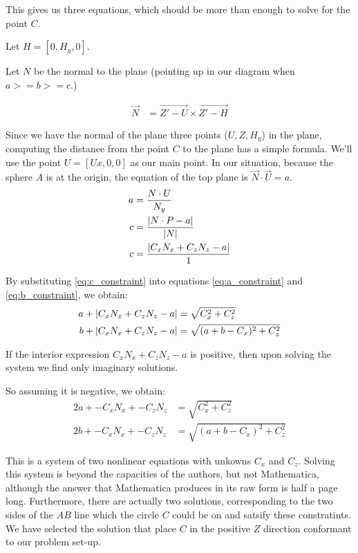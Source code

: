 \documentclass{article}
\begin{document}
This gives us three equations, which
should be more than enough to solve for the point $C$.

Let $H = [0, H_y,0]$.

Let $N$ be the normal to the plane (pointing up in our diagram
when $ a >= b >= c $.)

\begin{align}
\overrightarrow{N} &= \overrightarrow{Z' - U}  \times \overrightarrow{Z' - H}
\end{align}

Since we have the normal of the plane three points ($U,Z,H_y$) in the plane,
computing the distance from the point $C$ to the plane has a simple
formula.
We'll use the point $U = [Ux, 0, 0]$ as our main point.
In our situation, because the sphere $A$ is at the origin,
the equation of the top plane  is
$ \overrightarrow{N} \cdot \overrightarrow{U} = a$.
\begin{align}
a &= \frac{N \cdot U}{N_y} \\
c &= \frac{\left\lvert N \cdot P - a\right\rvert}{\left\lvert N\right\rvert} \\
c &= \frac{\left\lvert C_x  N_x  + C_z  N_z - a\right\rvert}{1} \label{eq:c_constraint}
\end{align}

By substituting \ref{eq:c_constraint} into equations
\ref{eq:a_constraint} and \ref{eq:b_constraint},
we obtain:
\begin{align}
  a + \left\lvert C_x N_x + C_z N_z - a\right\rvert &= \sqrt{C_x^2 + C_z^2} \\
  b + \left\lvert C_x N_x + C_z N_z - a\right\rvert &= \sqrt{(a+b-C_x)^2 + C_z^2}
\end{align}

If the interior expression $C_x N_x + C_z N_z - a$ is positive,
then upon solving the system we find only imaginary solutions.

So assuming it is negative, we obtain:
\begin{align}
  2a + -C_x N_x + -C_z N_z  &= \sqrt{C_x^2 + C_z ^2} \\
  2b + -C_x N_x + -C_z N_z  &= \sqrt{(a+b-C_x)^2 + C_z^2}
\end{align}



This is a system of two nonlinear equations with unkowns $C_x$ and $C_z$.
Solving this system is beyond the capacities of the authors,
but not Mathematica, although the answer that Mathematica produces
in its raw form is half a page long.
Furthermore, there are actually two solutions, corresponding
to the two sides of the $AB$ line which the circle $C$ could be
on and satsify these constratints.
We have selected the solution that place $C$ in the positive $Z$
direction conformant to our problem set-up.
\end{document}
